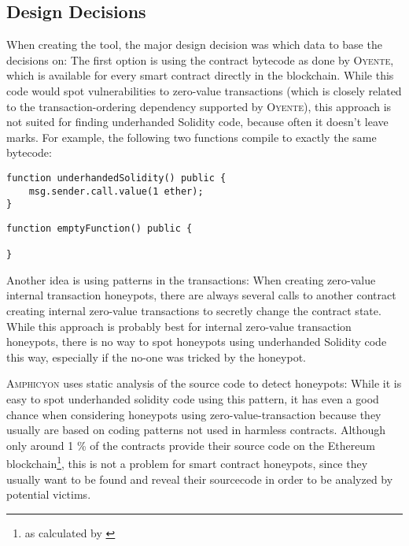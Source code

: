 \subsection{Design Decisions}
When creating the tool, the major design decision was which data to base the decisions on: The first option is using the contract bytecode as done by \textsc{Oyente}, which is available for every smart contract directly in the blockchain. While this code would spot vulnerabilities to zero-value transactions (which is closely related to the transaction-ordering dependency supported by \textsc{Oyente}), this approach is not suited for finding underhanded Solidity code, because often it doesn't leave marks. For example, the following two functions compile to exactly the same bytecode:

\begin{multicols}{2}
	\begin{verbatim}
function underhandedSolidity() public {
    msg.sender.call.value(1 ether);
}
\end{verbatim}

	\begin{verbatim}
function emptyFunction() public {

}
\end{verbatim}
\end{multicols}

Another idea is using patterns in the transactions: When creating zero-value internal transaction honeypots, there are always several calls to another contract creating internal zero-value transactions to secretly change the contract state. While this approach is probably best for internal zero-value transaction honeypots, there is no way to spot honeypots using underhanded Solidity code this way, especially if the no-one was tricked by the honeypot.

\textsc{Amphicyon} uses static analysis of the source code to detect honeypots: While it is easy to spot underhanded solidity code using this pattern, it has even a good chance when considering honeypots using zero-value-transaction because they usually are based on coding patterns not used in harmless contracts. Although only around 1 \% of the contracts provide their source code on the Ethereum blockchain\footnote{as calculated by \cite[Introduction]{nikolic:findingbadcontractsatscale}}, this is not a problem for smart contract honeypots, since they usually want to be found and reveal their sourcecode in order to be analyzed by potential victims.
